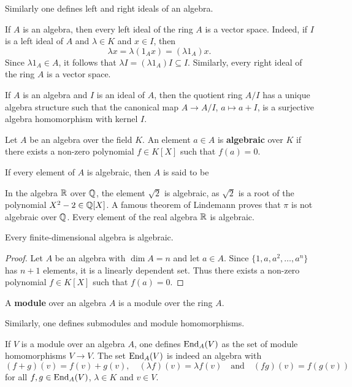 Similarly one defines left and right ideals of an algebra.

If $A$ is an algebra, then every left ideal of the ring $A$ is a vector space.  
Indeed, if $I$ is a left ideal of $A$ 
and $\lambda\in K$ and $x\in I$, then 
\[
	\lambda x=\lambda (1_Ax)=(\lambda 1_A)x.
\]
Since $\lambda 1_A\in A$, it follows that  $\lambda I=(\lambda
1_A)I\subseteq I$. 
Similarly, every right ideal of the ring $A$ is a vector space. 

If $A$ is an algebra and $I$ is an ideal of $A$, then the quotient ring $A/I$ has a unique algebra
structure such that the canonical map  
$A\to A/I$, $a\mapsto a+I$, is a surjective algebra homomorphism with kernel $I$. 

\begin{definition}
    Let $A$ be an algebra over the field $K$. An element $a\in A$ is 
    \textbf{algebraic} over $K$ if there exists a non-zero polynomial $f\in K[X]$
    such that $f(a)=0$. 
\end{definition}

If every element of $A$ is algebraic, then $A$ is said to be  

In the algebra $\mathbb{R}$ over $\mathbb{Q}$, the element $\sqrt{2}$ is algebraic, as $\sqrt{2}$ is a root of the polynomial $X^2-2\in\mathbb{Q}[X]$. A famous theorem of Lindemann proves that $\pi$ is not algebraic over $\mathbb{Q}$. Every element of the real algebra $\mathbb{R}$ is algebraic.

\begin{proposition}
	\label{lem:algebraic}
	Every finite-dimensional algebra is algebraic.
\end{proposition}

\begin{proof}
   Let $A$ be an algebra with $\dim A=n$ and let $a\in A$. Since  
	$\{1,a,a^2,\dots,a^n\}$ has $n+1$ elements, it is a linearly dependent set. Thus there exists 
	a non-zero polynomial $f\in K[X]$ such that $f(a)=0$.
\end{proof}

\begin{definition}
    A \textbf{module} over an algebra $A$ is a module 
    over the ring $A$.
\end{definition}

Similarly, one defines submodules and module homomorphisms. 

\begin{example}
If $V$ is a module over an algebra $A$, one defines $\operatorname{End}_A(V)$ as the set
of module homomorphisms $V\to V$. The set  
$\operatorname{End}_A(V)$ is indeed an algebra with 
\[
(f+g)(v)=f(v)+g(v),\quad 
(\lambda f)(v)=\lambda f(v)
\quad\text{and}
\quad 
(fg)(v)=f(g(v))
\]
for all $f,g\in\operatorname{End}_A(V)$, 
$\lambda\in K$ and $v\in V$. 
\end{example}

